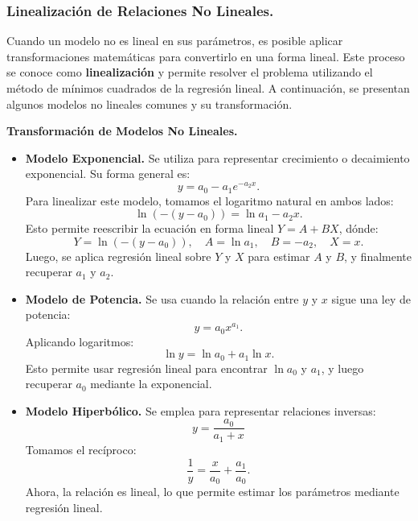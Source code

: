 \documentclass{article}
\begin{document}
\newpage
\subsubsection{Linealización de Relaciones No Lineales.}
\label{subsec:linealizacion}
Cuando un modelo no es lineal en sus parámetros, es posible aplicar transformaciones matemáticas para convertirlo en una forma lineal. Este proceso se conoce como \textbf{linealización} y permite resolver el problema utilizando el método de mínimos cuadrados de la regresión lineal. A continuación, se presentan algunos modelos no lineales comunes y su transformación.

\noindent \textbf{Transformación de Modelos No Lineales.}
\begin{itemize}
    \item \textbf{Modelo Exponencial.} Se utiliza para representar crecimiento o decaimiento exponencial. Su forma general es:
    \begin{equation}
        y = a_0 - a_1 e^{-a_2 x}.
    \end{equation}
    Para linealizar este modelo, tomamos el logaritmo natural en ambos lados:
    $$\ln(-(y - a_0)) = \ln a_1 - a_2 x.$$
    Esto permite reescribir la ecuación en forma lineal $Y = A + BX$, dónde:
    \begin{equation}
        Y = \ln(-(y - a_0)), \quad A = \ln a_1, \quad B = -a_2, \quad X = x.
    \end{equation}
    Luego, se aplica regresión lineal sobre $Y$ y $X$ para estimar $A$ y $B$, y finalmente recuperar $a_1$ y $a_2$.

    \item \textbf{Modelo de Potencia.} Se usa cuando la relación entre $y$ y $x$ sigue una ley de potencia:
    \begin{equation}
        y = a_0 x^{a_1}.
    \end{equation}
    Aplicando logaritmos:
    $$\ln y = \ln a_0 + a_1 \ln x.$$
    Esto permite usar regresión lineal para encontrar $\ln a_0$ y $a_1$, y luego recuperar $a_0$ mediante la exponencial.

    \item \textbf{Modelo Hiperbólico.} Se emplea para representar relaciones inversas:
    \begin{equation}
        y = \frac{a_0}{a_1 + x}
    \end{equation}
    Tomamos el recíproco:
    $$
        \frac{1}{y} = \frac{x}{a_0} + \frac{a_1}{a_0} .
    $$
    Ahora, la relación es lineal, lo que permite estimar los parámetros mediante regresión lineal.
\end{itemize}
\end{document}

